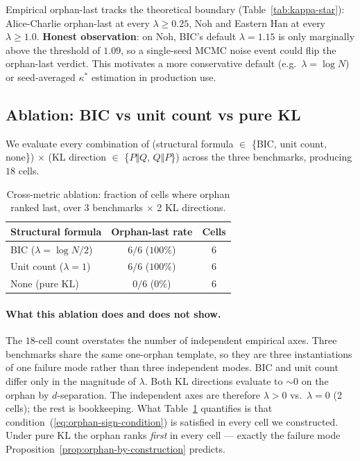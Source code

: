 \documentclass{article}
\begin{document}
Empirical orphan-last tracks the theoretical boundary
(Table~\ref{tab:kappa-star}): Alice-Charlie orphan-last at every
$\lambda \geq 0.25$, Noh and Eastern Han at every $\lambda \geq 1.0$.
\textbf{Honest observation}: on Noh, BIC's default $\lambda = 1.15$
is only marginally above the threshold of $1.09$, so a
single-seed MCMC noise event could flip the orphan-last verdict.
This motivates a more conservative default (e.g.\
$\lambda = \log N$) or seed-averaged $\kappa^{*}$ estimation in
production use.

\subsection{Ablation: BIC vs unit count vs pure KL}
\label{sec:ablation}

We evaluate every combination of (structural formula $\in$
\{BIC, unit count, none\}) $\times$ (KL direction $\in$ \{$P \Vert
Q$, $Q \Vert P$\}) across the three benchmarks, producing $18$
cells.

\begin{table}[h]
\centering
\caption{Cross-metric ablation: fraction of cells where orphan
ranked last, over 3 benchmarks $\times$ 2 KL directions.}
\label{tab:ablation}
\begin{tabular}{lcc}
\toprule
Structural formula & Orphan-last rate & Cells \\
\midrule
BIC ($\lambda = \log N / 2$) & $6/6$ ($100\%$) & 6 \\
Unit count ($\lambda = 1$)   & $6/6$ ($100\%$) & 6 \\
None (pure KL)               & $0/6$ ($0\%$)   & 6 \\
\bottomrule
\end{tabular}
\end{table}

\paragraph{What this ablation does and does not show.} The $18$-cell
count overstates the number of independent empirical axes. Three
benchmarks share the same one-orphan template, so they are three
instantiations of one failure mode rather than three independent
modes. BIC and unit count differ only in the magnitude of $\lambda$.
Both KL directions evaluate to $\sim 0$ on the orphan by
$d$-separation. The independent axes are therefore
$\lambda > 0$ vs.\ $\lambda = 0$ (2 cells); the rest is
bookkeeping. What Table~\ref{tab:ablation} quantifies is that
condition~(\ref{eq:orphan-sign-condition}) is satisfied in every cell
we constructed. Under pure KL the orphan ranks \emph{first} in every
cell --- exactly the failure mode
Proposition~\ref{prop:orphan-by-construction} predicts.
\end{document}
